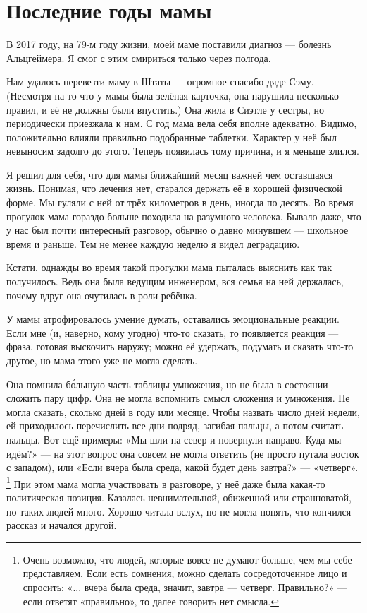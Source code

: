 \section*{Последние годы мамы}
В 2017 году, на 79-м году жизни, моей маме поставили диагноз --- болезнь Альцгеймера.
Я смог с этим смириться только через полгода.

Нам удалось перевезти маму в Штаты --- огромное спасибо дяде Сэму.
(Несмотря на то что у мамы была зелёная карточка, она нарушила несколько правил, и её не должны были впустить.)
Она жила в Сиэтле у сестры, но периодически приезжала к нам.
С год мама вела себя вполне адекватно.
Видимо, положительно влияли правильно подобранные таблетки.
Характер у неё был невыносим задолго до этого.
Теперь появилась тому причина, и я меньше злился.

Я решил для себя, что для мамы ближайший месяц важней чем оставшаяся жизнь.
Понимая, что лечения нет, старался держать её в хорошей физической форме.
Мы гуляли с ней от трёх километров в день, иногда по десять.
Во время прогулок мама гораздо больше походила на разумного человека. 
Бывало даже, что у нас был почти интересный разговор, обычно о давно минувшем --- школьное время и раньше.
Тем не менее каждую неделю я видел деградацию.

Кстати, однажды во время такой прогулки мама пыталась выяснить как так получилось.
Ведь она была ведущим инженером, вся семья на ней держалась, почему вдруг она очутилась в роли ребёнка.

У мамы атрофировалось умение думать, оставались эмоциональные реакции.
Если мне (и, наверно, кому угодно) что-то сказать, то появляется реакция --- фраза, готовая выскочить наружу; можно её удержать, подумать и сказать что-то другое, но мама этого уже не могла сделать.

Она помнила б\'{о}льшую часть таблицы умножения, но не была в состоянии сложить пару цифр.
Она не могла вспомнить смысл сложения и умножения.
Не могла сказать, сколько дней в году или месяце.
Чтобы назвать число дней недели, ей приходилось перечислить все дни подряд, загибая пальцы,
а потом считать пальцы.
Вот ещё примеры: «Мы шли на север и повернули направо. Куда мы идём?» --- на этот вопрос она совсем не могла ответить (не просто путала восток с западом),
или «Если вчера была среда, какой будет день завтра?» --- «четверг».%
\footnote{Очень возможно, что людей, которые вовсе не думают больше, чем мы себе представляем.
Если есть сомнения, можно сделать сосредоточенное лицо и спросить: «... вчера была среда, значит, завтра --- четверг. Правильно?» --- если ответят «правильно», то далее говорить нет смысла.}
При этом мама могла участвовать в разговоре, у неё даже была какая-то политическая позиция.
Казалась невнимательной, обиженной или странноватой, но таких людей много.
Хорошо читала вслух, но не могла понять, что кончился рассказ и начался другой.

